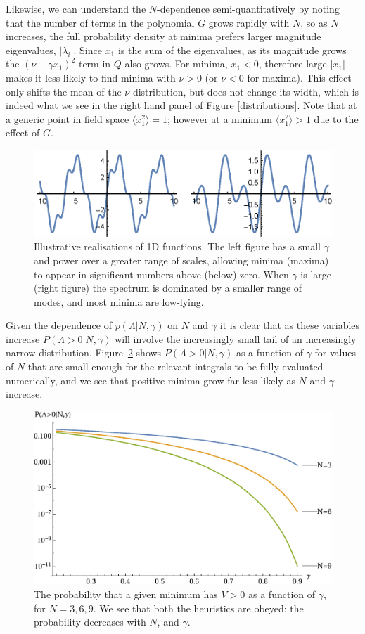 \documentclass[12pt]{article}
\begin{document}
Likewise, we can understand the $N$-dependence semi-quantitatively by noting that the number of terms in the polynomial $G$ grows rapidly with $N$, so as $N$ increases, the full probability density at minima prefers larger magnitude eigenvalues, $|\lambda_i|$. Since $x_1$ is the sum of the eigenvalues, as its magnitude grows the $(\nu-\gamma x_1)^2$ term in $Q$ also grows. For minima, $x_1<0$, therefore large $|x_1|$ makes it less likely to find minima with $\nu >0$ (or $\nu <0 $ for maxima). This effect only shifts the mean of the $\nu$ distribution, but does not change its width, which is indeed what we see in the right hand panel of Figure \ref{distributions}. Note that at a generic point in field space $\langle x_1^2\rangle = 1$; however at a minimum $\langle x_1^2 \rangle >1$ due to the effect of $G$.   


\begin{figure}
  \centering
    \includegraphics[width=0.8 \linewidth]{TwoSigmas.eps}
  \caption{Illustrative realisations of 1D functions. The left figure has a small $\gamma$ and power over a greater range of scales, allowing minima (maxima) to appear in significant numbers above (below) zero. When $\gamma$ is large (right figure) the spectrum is dominated by a smaller range of modes, and most minima are low-lying.}
  \label{examples1}
\end{figure}

Given the dependence of $p(\Lambda|N,\gamma)$ on $N$ and $\gamma$ it is clear that as these variables increase $P(\Lambda>0|N,\gamma)$ will involve the increasingly small tail of an increasingly narrow distribution. Figure~\ref{N6} shows $P(\Lambda>0|N,\gamma)$ as a function of $\gamma$ for values of $N$ that are small enough for the relevant integrals to be fully evaluated numerically, and we see that positive minima grow far less likely as $N$ and $\gamma$ increase. 

\begin{figure}
  \centering
  \includegraphics[width=0.8 \linewidth]{N369.eps}
  \caption{The probability that a given minimum has $V > 0$ as a function of $\gamma$, for $N=3, 6, 9$. We see that both the heuristics are obeyed: the probability decreases with $N$, and  $\gamma$.}
  \label{N6}
  \end{figure}
\end{document}
